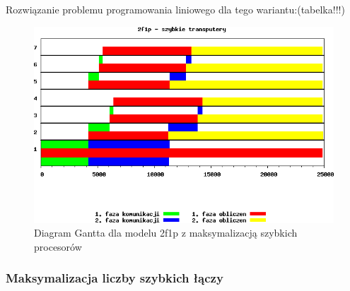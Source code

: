 \documentclass[a4paper,11pt, titlepage]{article}
\begin{document}
Rozwiązanie problemu programowania liniowego dla tego wariantu:(tabelka!!!)
\begin{figure}[htp!]
\includegraphics[width=1.0\textwidth]{wykresy/1p2f_proc}
\caption{Diagram Gantta dla modelu 2f1p z maksymalizacją szybkich procesorów \label{1p2f_p}}
\end{figure}

\subsubsection{Maksymalizacja liczby szybkich łączy}
\end{document}

